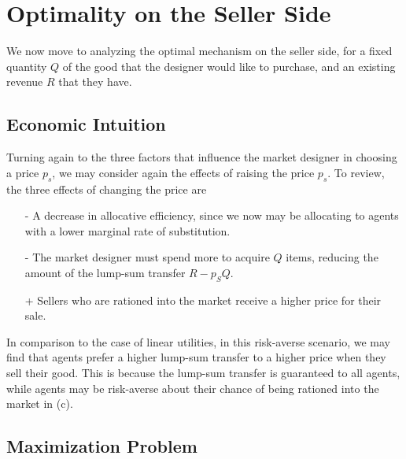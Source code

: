 \documentclass[AER]{AEA}
\begin{document}

\section{Optimality on the Seller Side}

We now move to analyzing the optimal mechanism on the seller side, for a fixed quantity $Q$ of the good that the designer would like to purchase, and an existing revenue $R$ that they have.

\subsection{Economic Intuition}

Turning again to the three factors that influence the market designer in choosing a price $p_s$, we may consider again the effects of raising the price $p_s$. To review, the three effects of changing the price are

\begin{enumerate}[(a)]
    \item [-] A decrease in allocative efficiency, since we now may be allocating to agents with a lower marginal rate of substitution. 
    \item [-] The market designer must spend more to acquire $Q$ items, reducing the amount of the lump-sum transfer $R - p_SQ$.
    \item [+] Sellers who are rationed into the market receive a higher price for their sale.
\end{enumerate}

In comparison to the case of linear utilities, in this risk-averse scenario, we may find that agents prefer a higher lump-sum transfer to a higher price when they sell their good. This is because the lump-sum transfer is guaranteed to all agents, while agents may be risk-averse about their chance of being rationed into the market in (c).


\subsection{Maximization Problem}
\end{document}
